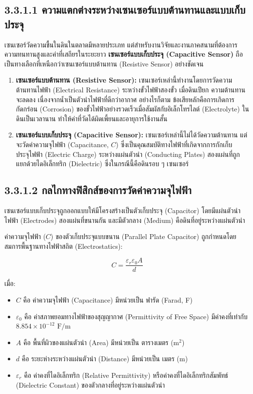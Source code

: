 \documentclass[11pt,a4paper,openany]{report}
\begin{document}
\subsection{3.3.1.1 ความแตกต่างระหว่างเซนเซอร์แบบต้านทานและแบบเก็บประจุ}


เซนเซอร์วัดความชื้นในดินในตลาดมีหลายประเภท แต่สำหรับงานวิจัยและงานภาคสนามที่ต้องการความทนทานสูงและค่าที่เสถียรในระยะยาว \textbf{เซนเซอร์แบบเก็บประจุ (Capacitive Sensor)} ถือเป็นทางเลือกที่เหนือกว่าเซนเซอร์แบบต้านทาน (Resistive Sensor) อย่างชัดเจน

\begin{enumerate}
  \item \textbf{เซนเซอร์แบบต้านทาน (Resistive Sensor):} เซนเซอร์เหล่านี้ทำงานโดยการวัดความต้านทานไฟฟ้า (Electrical Resistance) ระหว่างขั้วไฟฟ้าสองขั้ว เมื่อดินเปียก ความต้านทานจะลดลง เนื่องจากน้ำเป็นตัวนำไฟฟ้าที่ดีกว่าอากาศ อย่างไรก็ตาม ข้อเสียหลักคือการเกิดการกัดกร่อน (Corrosion) ของขั้วไฟฟ้าอย่างรวดเร็วเมื่อสัมผัสกับอิเล็กโทรไลต์ (Electrolyte) ในดินเป็นเวลานาน ทำให้ค่าที่วัดได้ผิดเพี้ยนและอายุการใช้งานสั้น
  \item \textbf{เซนเซอร์แบบเก็บประจุ (Capacitive Sensor):} เซนเซอร์เหล่านี้ไม่ได้วัดความต้านทาน แต่จะวัดค่าความจุไฟฟ้า (Capacitance, $C$) ซึ่งเป็นคุณสมบัติทางไฟฟ้าที่เกิดจากการกักเก็บประจุไฟฟ้า (Electric Charge) ระหว่างแผ่นตัวนำ (Conducting Plates) สองแผ่นที่ถูกแยกด้วยไดอิเล็กทริก (Dielectric) ซึ่งในกรณีนี้คือดินรอบ ๆ เซนเซอร์
\end{enumerate}


\subsection{3.3.1.2 กลไกทางฟิสิกส์ของการวัดค่าความจุไฟฟ้า}


เซนเซอร์แบบเก็บประจุถูกออกแบบให้มีโครงสร้างเป็นตัวเก็บประจุ (Capacitor) โดยมีแผ่นตัวนำไฟฟ้า (Electrodes) สองแผ่นที่ขนานกัน และมีตัวกลาง (Medium) คือดินที่อยู่ระหว่างแผ่นตัวนำ

ค่าความจุไฟฟ้า ($C$) ของตัวเก็บประจุแบบขนาน (Parallel Plate Capacitor) ถูกกำหนดโดยสมการพื้นฐานทางไฟฟ้าสถิต (Electrostatics):

$$C = \frac{\varepsilon_r \varepsilon_0 A}{d}$$


เมื่อ:
\begin{itemize}
  \item $C$ คือ ค่าความจุไฟฟ้า (Capacitance) มีหน่วยเป็น ฟารัด (Farad, F)
  \item $\varepsilon_0$ คือ ค่าสภาพยอมทางไฟฟ้าของสุญญากาศ (Permittivity of Free Space) มีค่าคงที่เท่ากับ $8.854 \times 10^{-12} \text{ F/m}$
  \item $A$ คือ พื้นที่ผิวของแผ่นตัวนำ (Area) มีหน่วยเป็น ตารางเมตร ($\text{m}^2$)
  \item $d$ คือ ระยะห่างระหว่างแผ่นตัวนำ (Distance) มีหน่วยเป็น เมตร ($\text{m}$)
  \item $\varepsilon_r$ คือ ค่าคงที่ไดอิเล็กทริก (Relative Permittivity) หรือค่าคงที่ไดอิเล็กทริกสัมพัทธ์ (Dielectric Constant) ของตัวกลางที่อยู่ระหว่างแผ่นตัวนำ
\end{itemize}
\end{document}
